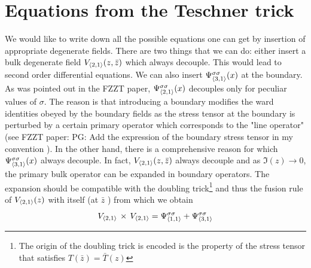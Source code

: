 \documentclass[a4paper]{article}
\newcommand{\purple}[1]{{\color{purple} #1 \color{black}}}
\newcommand{\PG}[1]{{\purple{PG: #1}}} %
\begin{document}
\section{Equations from the Teschner trick}
We would like to write down all the possible equations one can get by insertion of appropriate degenerate fields. There are two things that we can do: either insert a bulk degenerate field $V_{\braket{2,1}}(z,\bar{z})$ which always decouple. This would lead to second order differential equations. We can also insert $\Psi_{\braket{3,1}}^{\sigma \sigma}(x)$ at the boundary. As was pointed out in the FZZT paper, $\Psi_{\braket{2,1}}^{\sigma \sigma}(x)$ decouples only for peculiar values of $\sigma$. The reason is that introducing a boundary modifies the ward identities obeyed by the boundary fields as the stress tensor at the boundary is perturbed by a certain primary operator which corresponds to the "line operator" (see FZZT paper: \PG{Add the expression of the boundary stress tensor in my convention}). In the other hand, there is a comprehensive reason for which $\Psi_{\braket{3,1}}^{\sigma \sigma}(x)$ always decouple. In fact, $V_{\braket{2,1}}(z,\bar{z})$ always decouple and as $\Im (z)\to 0$, the primary bulk operator can be expanded in boundary operators. The expansion should be compatible with the doubling trick\footnote{The origin of the doubling trick is encoded is the property of the stress tensor that satisfies $T(\bar{z})=\bar{T}(z)$} and thus the fusion rule of $V_{\braket{2,1}}(z)$ with itself (at $\bar{z}$ ) from which we obtain
\begin{equation}
  V_{\braket{2,1}}\,\times\,V_{\braket{2,1}} = \Psi_{\braket{1,1}}^{\sigma \sigma} + \Psi_{\braket{3,1}}^{\sigma \sigma}
\end{equation}
\end{document}
